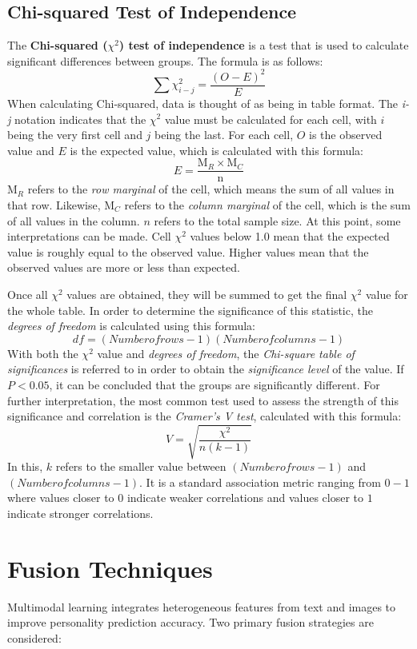 \subsection{Chi-squared Test of Independence}
The \textbf{Chi-squared ($\chi^2$) test of independence} is a test that is used to calculate significant differences between groups. The formula is as follows:
$$\sum\chi^2_{i-j} = \frac{(O - E)^2}{E}$$
When calculating Chi-squared, data is thought of as being in table format. The \textit{i-j} notation indicates that the $\chi^2$ value must be calculated for each cell, with $i$ being the very first cell and $j$ being the last. For each cell, $O$ is the observed value and $E$ is the expected value, which is calculated with this formula:
$$E = \frac{ \text{M}_R  \times  \text{M}_C }{\text{n}}$$
$\text{M}_R$ refers to the \textit{row marginal} of the cell, which means the sum of all values in that row. Likewise, $\text{M}_C$ refers to the \textit{column marginal} of the cell, which is the sum of all values in the column. $n$ refers to the total sample size. At this point, some interpretations can be made. Cell $\chi^2$ values below 1.0 mean that the expected value is roughly equal to the observed value. Higher values mean that the observed values are more or less than expected.

Once all $\chi^2$ values are obtained, they will be summed to get the final $\chi^2$ value for the whole table. In order to determine the significance of this statistic, the \textit{degrees of freedom} is calculated using this formula:
$$df = (Number of rows - 1)(Number of columns - 1)$$
With both the $\chi^2$ value and \textit{degrees of freedom}, the \textit{Chi-square table of significances} is referred to in order to obtain the \textit{significance level} of the value. If $P < 0.05$, it can be concluded that the groups are significantly different. For further interpretation, the most common test used to assess the strength of this significance and correlation is the \textit{Cramer’s V test}, calculated with this formula:
$$V = \sqrt{ \frac{ \chi^2 }{ n(k - 1) } }$$
In this, $k$ refers to the smaller value between $(Number of rows - 1)$ and $(Number of columns - 1)$. It is a standard association metric ranging from $0-1$ where values closer to $0$ indicate weaker correlations and values closer to $1$ indicate stronger correlations.

\section{Fusion Techniques}
Multimodal learning integrates heterogeneous features from text and images to improve personality prediction accuracy. Two primary fusion strategies are considered:

